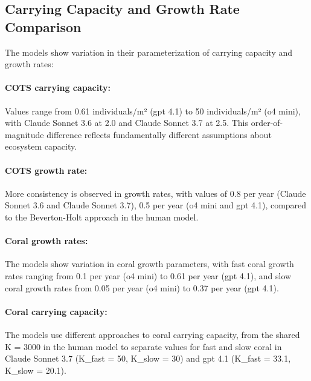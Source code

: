 \subsection{Carrying Capacity and Growth Rate Comparison}
\label{subsec:carrying_capacity_comparison}

The models show variation in their parameterization of carrying capacity and growth rates:

\paragraph{COTS carrying capacity:} Values range from 0.61 individuals/m² (gpt 4.1) to 50 individuals/m² (o4 mini), with Claude Sonnet 3.6 at 2.0 and Claude Sonnet 3.7 at 2.5. This order-of-magnitude difference reflects fundamentally different assumptions about ecosystem capacity.

\paragraph{COTS growth rate:} More consistency is observed in growth rates, with values of 0.8 per year (Claude Sonnet 3.6 and Claude Sonnet 3.7), 0.5 per year (o4 mini and gpt 4.1), compared to the Beverton-Holt approach in the human model.

\paragraph{Coral growth rates:} The models show variation in coral growth parameters, with fast coral growth rates ranging from 0.1 per year (o4 mini) to 0.61 per year (gpt 4.1), and slow coral growth rates from 0.05 per year (o4 mini) to 0.37 per year (gpt 4.1).

\paragraph{Coral carrying capacity:} The models use different approaches to coral carrying capacity, from the shared K = 3000 in the human model to separate values for fast and slow coral in Claude Sonnet 3.7 (K\_fast = 50, K\_slow = 30) and gpt 4.1 (K\_fast = 33.1, K\_slow = 20.1).